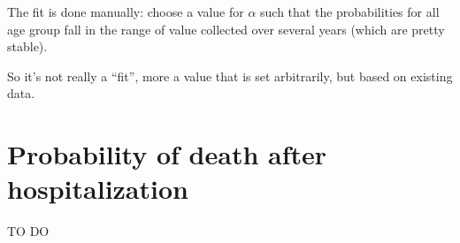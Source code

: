\documentclass[10pt,twocolumn]{article}
\begin{document}
The fit is done manually: choose a value for $\alpha$ such that the probabilities for all age group fall in the range of value collected over several years (which are pretty stable\cite{Schanzer:2013dn}).

So it's not really a ``fit'', more a value that is set arbitrarily, but based on existing data.



\section{Probability of death after hospitalization}


TO DO
\end{document}
